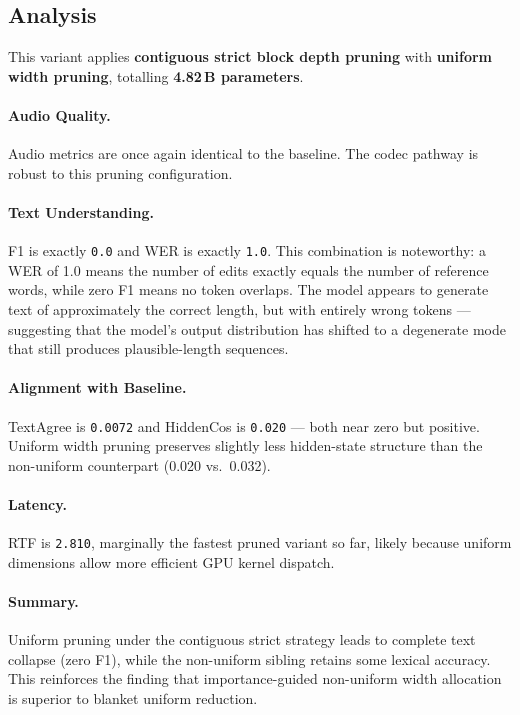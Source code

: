 \documentclass[11pt,a4paper]{article}
\newcommand{\scoreval}[1]{\texttt{#1}}
\begin{document}
\subsection{Analysis}

This variant applies \textbf{contiguous strict block depth pruning} with \textbf{uniform width pruning}, totalling \textbf{4.82\,B parameters}.

\paragraph{Audio Quality.}
Audio metrics are once again identical to the baseline. The codec pathway is robust to this pruning configuration.

\paragraph{Text Understanding.}
F1 is exactly \scoreval{0.0} and WER is exactly \scoreval{1.0}. This combination is noteworthy: a WER of 1.0 means the number of edits exactly equals the number of reference words, while zero F1 means no token overlaps. The model appears to generate text of approximately the correct length, but with entirely wrong tokens — suggesting that the model's output distribution has shifted to a degenerate mode that still produces plausible-length sequences.

\paragraph{Alignment with Baseline.}
TextAgree is \scoreval{0.0072} and HiddenCos is \scoreval{0.020} — both near zero but positive. Uniform width pruning preserves slightly less hidden-state structure than the non-uniform counterpart (0.020 vs.\ 0.032).

\paragraph{Latency.}
RTF is \scoreval{2.810}, marginally the fastest pruned variant so far, likely because uniform dimensions allow more efficient GPU kernel dispatch.

\paragraph{Summary.}
Uniform pruning under the contiguous strict strategy leads to complete text collapse (zero F1), while the non-uniform sibling retains some lexical accuracy. This reinforces the finding that importance-guided non-uniform width allocation is superior to blanket uniform reduction.
\end{document}
